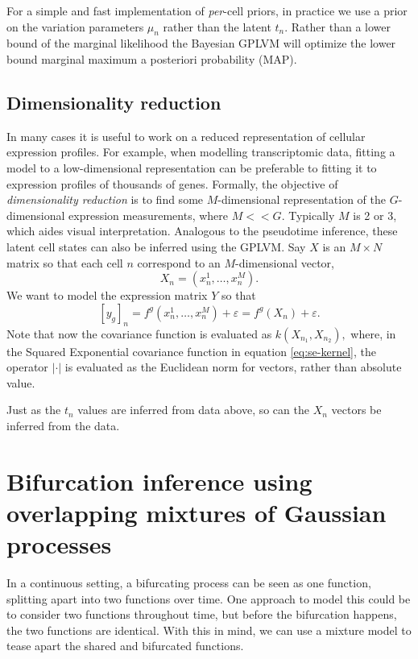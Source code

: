 For a simple and fast implementation of \textit{per}-cell priors, in practice we use a prior on the variation parameters $ \mu_n $ rather than the latent $ t_n $. Rather than a lower bound of the marginal likelihood the Bayesian GPLVM will optimize the lower bound marginal maximum a posteriori probability (MAP).

\subsection{Dimensionality reduction}

In many cases it is useful to work on a reduced representation of cellular expression profiles. For example, when modelling transcriptomic data, fitting a model to a low-dimensional representation can be preferable to fitting it to expression profiles of thousands of genes. Formally, the objective of \textit{dimensionality reduction} is to find some $ M $-dimensional representation of the $ G $-dimensional expression measurements, where $ M << G $. Typically $ M $ is 2 or 3, which aides visual interpretation. Analogous to the pseudotime inference, these latent cell states can also be inferred using the GPLVM. Say $ X $ is an $ M \times N $ matrix so that each cell $ n $ correspond to an $ M $-dimensional vector,
\[ X_n = (x^1_n, \ldots, x^M_n). \]
We want to model the expression matrix $ Y $ so that
\[ [y_g]_n = f^g(x^1_n, \ldots, x^M_n) + \varepsilon = f^g(X_n) + \varepsilon. \]
Note that now the covariance function is evaluated as $ k(X_{n_1}, X_{n_2}), $ where, in the Squared Exponential covariance function in equation \ref{eq:se-kernel}, the operator $ | \cdot | $ is evaluated as the Euclidean norm for vectors, rather than absolute value.

Just as the $ t_n $ values are inferred from data above, so can the $ X_n $ vectors be inferred from the data.

\section{Bifurcation inference using overlapping mixtures of Gaussian processes}
\label{sec:bif_method}

In a continuous setting, a bifurcating process can be seen as one function, splitting apart into two functions over time. One approach to model this could be to consider two functions throughout time, but before the bifurcation happens, the two functions are identical. With this in mind, we can use a mixture model to tease apart the shared and bifurcated functions.

